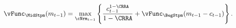   \begin{equation}\begin{gathered}\begin{aligned}
        \vFunc_{\MidStpm}(m_{\stp-1})   & = \max_{\cNrm_{\stp-1}}
        \left\{
          \frac{{c}_{\stp-1}^{1-\CRRA}}{1-\CRRA} +
          \vFunc_{\BegStpm}(m_{\stp-1}-c_{\stp-1})
        \right\}.
        \label{eq:vEndTm1}
      \end{aligned}\end{gathered}\end{equation}%
